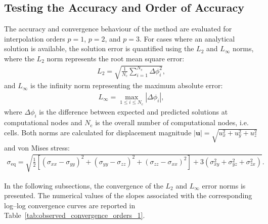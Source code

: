 \documentclass[review,3p]{elsarticle}
\begin{document}
\subsection{Testing the Accuracy and Order of Accuracy}
\label{case:Testing_the_Accuracy_and_Order_of_Accuracy}
%
The accuracy and convergence behaviour of the method are evaluated for interpolation orders $p = 1$, $p = 2$, and $p = 3$.
For cases where an analytical solution is available, the solution error is quantified using the $L_2$ and $L_\infty$ norms,
where the $L_2$ norm represents the root mean square error:
\begin{eqnarray}
	L_2 = \sqrt{\frac{1}{N_{\text{c}}}\sum_{i=1}^{N_{\text{c}}} \Delta \phi_i^2},
\end{eqnarray}
and $L_\infty$ is the infinity norm representing the maximum absolute error:
\begin{eqnarray}
	L_{\infty} = \max_{1 \leq i \leq N_{\text{c}}} |\Delta \phi_i|,
\end{eqnarray}
where $\Delta \phi_i$ is the difference between expected and predicted solutions at computational nodes and $N_{\text{c}}$ is the overall number of computational nodes, i.e. cells.
Both norms are calculated for displacement magnitude $|\boldsymbol{u}|=\sqrt{u_x^2+u_y^2+u_z^2}$ and von Mises stress:
\begin{eqnarray}
	\sigma_\text{eq}=\sqrt{\frac{1}{2}\left[  (\sigma_{xx}-\sigma_{yy})^2+(\sigma_{yy}-\sigma_{zz})^2+(\sigma_{zz}-\sigma_{xx})^2 \right]+3\left(\sigma_{xy}^2+\sigma_{yz}^2+\sigma_{zx}^2\right)}.
\end{eqnarray}

{\color{violet}In the following subsections, the convergence of the $L_2$ and $L_\infty$ error norms is presented. The numerical values of the slopes associated with the corresponding log--log convergence curves are reported in Table~\ref{tab:observed_convergence_orders_1}.}
%
\end{document}
